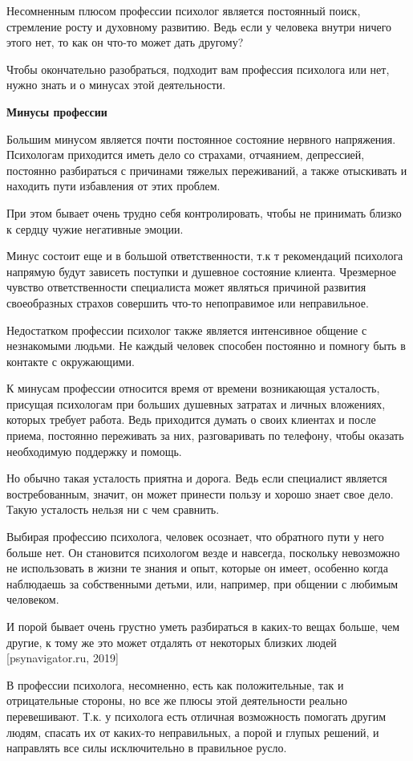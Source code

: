 Несомненным плюсом профессии психолог является постоянный поиск, стремление росту и духовному развитию. Ведь если у человека внутри ничего этого нет, то как он что-то может дать другому?

Чтобы окончательно разобраться, подходит вам профессия психолога или нет, нужно знать и о минусах этой деятельности.

\textbf{Минусы профессии}

Большим минусом является почти постоянное состояние нервного напряжения. Психологам приходится иметь дело со страхами, отчаянием, депрессией, постоянно разбираться с причинами тяжелых переживаний, а также отыскивать и находить пути избавления от этих проблем.

При этом бывает очень трудно себя контролировать, чтобы не принимать близко к сердцу чужие негативные эмоции.

Минус состоит еще и в большой ответственности, т.к т рекомендаций психолога напрямую будут зависеть поступки и душевное состояние клиента. Чрезмерное чувство ответственности специалиста может являться причиной развития своеобразных страхов совершить что-то непоправимое или неправильное.

Недостатком профессии психолог также является интенсивное общение с незнакомыми людьми. Не каждый человек способен постоянно и помногу быть в контакте с окружающими.

К минусам профессии относится время от времени возникающая усталость, присущая психологам при больших душевных затратах и личных вложениях, которых требует работа. Ведь приходится думать о своих клиентах и после приема, постоянно переживать за них, разговаривать по телефону, чтобы оказать необходимую поддержку и помощь.

Но обычно такая усталость приятна и дорога. Ведь если специалист является востребованным, значит, он может принести пользу и хорошо знает свое дело. Такую усталость нельзя ни с чем сравнить.

Выбирая профессию психолога, человек осознает, что обратного пути у него больше нет. Он становится психологом везде и навсегда, поскольку невозможно не использовать в жизни те знания и опыт, которые он имеет, особенно когда наблюдаешь за собственными детьми, или, например, при общении с любимым человеком.

И порой бывает очень грустно уметь разбираться в каких-то вещах больше, чем другие, к тому же это может отдалять от некоторых близких людей [psynavigator.ru, 2019]

В профессии психолога, несомненно, есть как положительные, так и отрицательные стороны, но все же плюсы этой деятельности реально перевешивают. Т.к. у психолога есть отличная возможность помогать другим людям, спасать их от каких-то неправильных, а порой и глупых решений, и направлять все силы исключительно в правильное русло.


